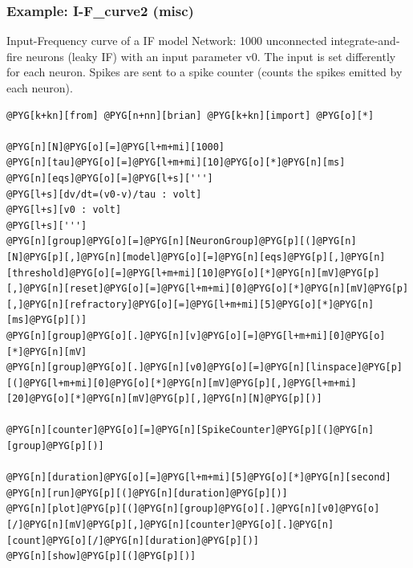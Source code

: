 \documentclass[letterpaper,10pt,english]{manual}
\begin{document}
\resetcurrentobjects
\hypertarget{--doc-examples-misc_I-F_curve2}{}

\hypertarget{index-37}{}\subsubsection{Example: I-F\_curve2 (misc)}

Input-Frequency curve of a IF model
Network: 1000 unconnected integrate-and-fire neurons (leaky IF)
with an input parameter v0.
The input is set differently for each neuron.
Spikes are sent to a spike counter (counts the spikes emitted by each neuron).

\begin{Verbatim}[commandchars=@\[\]]
@PYG[k+kn][from] @PYG[n+nn][brian] @PYG[k+kn][import] @PYG[o][*]

@PYG[n][N]@PYG[o][=]@PYG[l+m+mi][1000]
@PYG[n][tau]@PYG[o][=]@PYG[l+m+mi][10]@PYG[o][*]@PYG[n][ms]
@PYG[n][eqs]@PYG[o][=]@PYG[l+s][''']
@PYG[l+s][dv/dt=(v0-v)/tau : volt]
@PYG[l+s][v0 : volt]
@PYG[l+s][''']
@PYG[n][group]@PYG[o][=]@PYG[n][NeuronGroup]@PYG[p][(]@PYG[n][N]@PYG[p][,]@PYG[n][model]@PYG[o][=]@PYG[n][eqs]@PYG[p][,]@PYG[n][threshold]@PYG[o][=]@PYG[l+m+mi][10]@PYG[o][*]@PYG[n][mV]@PYG[p][,]@PYG[n][reset]@PYG[o][=]@PYG[l+m+mi][0]@PYG[o][*]@PYG[n][mV]@PYG[p][,]@PYG[n][refractory]@PYG[o][=]@PYG[l+m+mi][5]@PYG[o][*]@PYG[n][ms]@PYG[p][)]
@PYG[n][group]@PYG[o][.]@PYG[n][v]@PYG[o][=]@PYG[l+m+mi][0]@PYG[o][*]@PYG[n][mV]
@PYG[n][group]@PYG[o][.]@PYG[n][v0]@PYG[o][=]@PYG[n][linspace]@PYG[p][(]@PYG[l+m+mi][0]@PYG[o][*]@PYG[n][mV]@PYG[p][,]@PYG[l+m+mi][20]@PYG[o][*]@PYG[n][mV]@PYG[p][,]@PYG[n][N]@PYG[p][)]

@PYG[n][counter]@PYG[o][=]@PYG[n][SpikeCounter]@PYG[p][(]@PYG[n][group]@PYG[p][)]

@PYG[n][duration]@PYG[o][=]@PYG[l+m+mi][5]@PYG[o][*]@PYG[n][second]
@PYG[n][run]@PYG[p][(]@PYG[n][duration]@PYG[p][)]
@PYG[n][plot]@PYG[p][(]@PYG[n][group]@PYG[o][.]@PYG[n][v0]@PYG[o][/]@PYG[n][mV]@PYG[p][,]@PYG[n][counter]@PYG[o][.]@PYG[n][count]@PYG[o][/]@PYG[n][duration]@PYG[p][)]
@PYG[n][show]@PYG[p][(]@PYG[p][)]
\end{Verbatim}

\resetcurrentobjects
\hypertarget{--doc-examples-misc_if}{}
\end{document}
